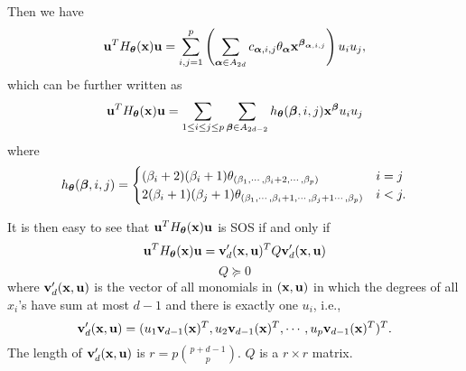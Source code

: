 \documentclass[11pt]{article}
\begin{document}
Then we have
\begin{equation}\notag
{\bf u}^TH_{\boldsymbol\theta}({\bf x}){\bf u} = \sum_{i,j=1}^p \left( \sum_{{\boldsymbol\alpha} \in A_{2d}} c_{{\boldsymbol\alpha}, i, j} \theta_{\boldsymbol\alpha}  {\bf x}^{{\boldsymbol\beta}_{{\boldsymbol\alpha}, i,j}} \right) u_iu_j,
\end{equation}
which can be further written as
\begin{equation} \label{lhs}
{\bf u}^TH_{\boldsymbol\theta}({\bf x}){\bf u} = \sum_{1 \le i \le j \le p}  \sum_{{\boldsymbol\beta} \in A_{2d - 2}} h_{\boldsymbol\theta} ({\boldsymbol\beta}, i, j) {\bf x}^{{\boldsymbol\beta}}  u_iu_j
\end{equation}
where
\begin{equation}\notag
h_{\boldsymbol\theta} ({\boldsymbol\beta}, i, j) =
\begin{cases}
(\beta_i + 2) (\beta_i + 1) \theta_{(\beta_1, \cdots, \beta_i + 2, \cdots, \beta_p)} & i = j\\
2(\beta_i + 1) (\beta_j + 1) \theta_{(\beta_1, \cdots, \beta_i + 1, \cdots, \beta_j + 1 \cdots, \beta_p)} & i < j.
\end{cases}
\end{equation}

It is then easy to see that ${\bf u}^TH_{\boldsymbol\theta}({\bf x}){\bf u}$ is SOS if and only if
\begin{equation} \label{sos-cvx}
{\bf u}^TH_{\boldsymbol\theta}({\bf x}){\bf u} = {\bf v}_d'({\bf x}, {\bf u})^T Q {\bf v}_d'({\bf x}, {\bf u})
\end{equation}
\begin{equation} \label{sos-cvx-psd}
Q \succeq 0
\end{equation}
where ${\bf v}_d'({\bf x}, {\bf u})$ is the vector of all monomials in $({\bf x}, {\bf u})$ in which the degrees of all $x_i$'s have sum at most $d-1$ and there is exactly one $u_i$, i.e., 
$${\bf v}_d'({\bf x}, {\bf u}) = (u_1 {\bf v}_{d-1}({\bf x})^T, u_2 {\bf v}_{d-1}({\bf x})^T, \cdots, u_p {\bf v}_{d-1}({\bf x})^T )^T.$$
The length of ${\bf v}_d'({\bf x}, {\bf u})$ is $r = p{p+d-1 \choose p}$. $Q$ is a $r \times r$ matrix.
\end{document}
